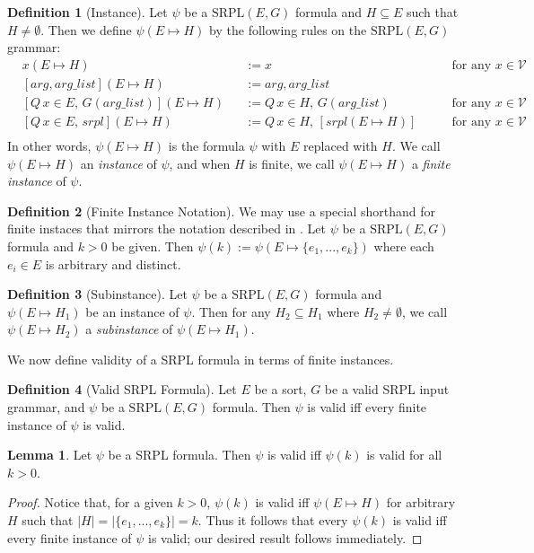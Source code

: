 \documentclass[12pt]{article}
\theoremstyle{definition}
\newtheorem{lemma}{Lemma}
\newtheorem{definition}{Definition}
\theoremstyle{remark}
\newcommand{\SRPL}{\text{SRPL}}
\begin{document}
\begin{definition}[Instance]
  Let $\psi$ be a $\SRPL(E,G)$ formula and $H \subseteq E$ such that $H \neq \emptyset$.  Then we define $\psi(E \mapsto H)$ by the following rules on the $\SRPL(E,G)$ grammar:
  \begin{align*}
    &x(E \mapsto H)& &:= x \qquad &\text{for any } x \in \mathcal{V}\\
    &[arg,arg\_list](E \mapsto H)& &:= arg,arg\_list\\
    &[Q \, x \in E, \, G(arg\_list)](E \mapsto H)& &:= Q \, x \in H, \, G(arg\_list) \qquad &\text{for any } x \in \mathcal{V}\\
    &[Q \, x \in E, \, srpl](E \mapsto H)& &:=Q \, x \in H, \, [srpl(E \mapsto H)]  \qquad &\text{for any } x \in \mathcal{V}\\
  \end{align*}
  In other words, $\psi(E \mapsto H)$ is the formula $\psi$ with $E$ replaced with $H$.  We call $\psi(E \mapsto H)$ an \textit{instance} of $\psi$, and when $H$ is finite, we call $\psi(E \mapsto H)$ a \textit{finite instance} of $\psi$.
\end{definition}

\begin{definition}[Finite Instance Notation]
  We may use a special shorthand for finite instaces that mirrors the notation described in \cite{goel2021symmetry}.  Let $\psi$ be a $\SRPL(E,G)$ formula and $k>0$ be given.  Then $\psi(k) := \psi(E \mapsto \{e_1,...,e_k\})$ where each $e_i \in E$ is arbitrary and distinct.
\end{definition}

\begin{definition}[Subinstance]
  Let $\psi$ be a $\SRPL(E,G)$ formula and $\psi(E \mapsto H_1)$ be an instance of $\psi$.  Then for any $H_2 \subseteq H_1$ where $H_2 \neq \emptyset$, we call $\psi(E \mapsto H_2)$ a \textit{subinstance} of $\psi(E \mapsto H_1)$.
\end{definition}

We now define validity of a SRPL formula in terms of finite instances.

\begin{definition}[Valid SRPL Formula]
  Let $E$ be a sort, $G$ be a valid SRPL input grammar, and $\psi$ be a $\SRPL(E,G)$ formula.  Then $\psi$ is valid iff every finite instance of $\psi$ is valid.
\end{definition}

\begin{lemma}
  \label{lem:valid-all-k}
  Let $\psi$ be a SRPL formula.  Then $\psi$ is valid iff $\psi(k)$ is valid for all $k>0$.
\end{lemma}
\begin{proof}
  Notice that, for a given $k>0$, $\psi(k)$ is valid iff $\psi(E \mapsto H)$ for arbitrary $H$ such that $|H|=|\{e_1,...,e_k\}|=k$.  Thus it follows that every $\psi(k)$ is valid iff every finite instance of $\psi$ is valid; our desired result follows immediately.
\end{proof}
\end{document}
